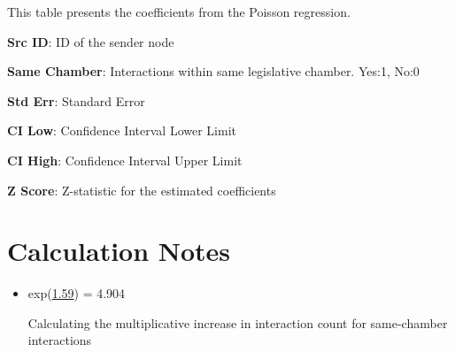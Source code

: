 \documentclass[11pt]{article}
\begin{document}
\begin{codeoutput}
\begin{table}[h]
\caption{Test of association between legislative chamber and frequency of Twitter interactions.}
\label{table:ChamberTwitterInteraction}
\begin{threeparttable}
\renewcommand{\TPTminimum}{\linewidth}
\begin{tablenotes}
\footnotesize
\item This table presents the coefficients from the Poisson regression.
\item \textbf{Src ID}: ID of the sender node
\item \textbf{Same Chamber}: Interactions within same legislative chamber. Yes:1, No:0
\item \textbf{Std Err}: Standard Error
\item \textbf{CI Low}: Confidence Interval Lower Limit
\item \textbf{CI High}: Confidence Interval Upper Limit
\item \textbf{Z Score}: Z-statistic for the estimated coefficients
\end{tablenotes}
\end{threeparttable}
\end{table}

\end{codeoutput}

\section{Calculation Notes}
\begin{itemize}
\item{exp(\hyperlink{B1a}{1.59}) = 4.904

Calculating the multiplicative increase in interaction count for same-chamber interactions}
\end{itemize}
\end{document}
